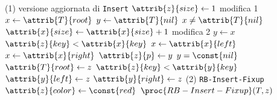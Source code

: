\begin{codebox}
\zi \Comment (1) versione aggiornata di \texttt{Insert}
\li $\attrib{z}{size} \gets 1$
	\Comment modifica 1
\li $x \gets \attrib{T}{root}$
\li $y \gets \attrib{T}{nil}$ 
\li \While $x \neq \attrib{T}{nil}$
\li \Do
        $\attrib{x}{size} \gets \attrib{x}{size} + 1$
        \Comment modifica 2
\li     $y \gets x$
\li     \If $\attrib{z}{key} < \attrib{x}{key}$
\li     \Then
            $x \gets \attrib{x}{left}$
\li     \Else
\li         $x \gets \attrib{x}{right}$
        \End
    \End
\li $\attrib{z}{p} \gets y$
\li \If $y = \const{nil}$
\li \Then
        $\attrib{T}{root} \gets z$
\li \Else 
\li     \If $\attrib{z}{key} < \attrib{y}{key}$
\li     \Then
            $\attrib{y}{left} \gets z$
\li     \Else
\li         $\attrib{y}{right} \gets z$
        \End
    \End
\zi \Comment (2) \texttt{RB-Insert-Fixup}
\li $\attrib{z}{color} \gets \const{red}$
\li $\proc{RB-Insert-Fixup}(T,z)$
\end{codebox}